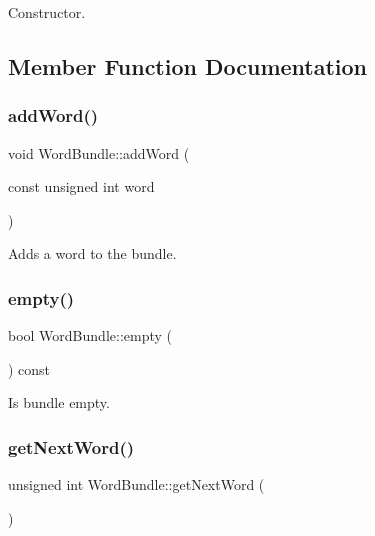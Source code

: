 Constructor. 



\subsection{Member Function Documentation}
\mbox{\label{class_word_bundle_a167d2b6b4f504e4347191a8e5bb47e5e}} 
\subsubsection{\texorpdfstring{add\+Word()}{addWord()}}
{\footnotesize\ttfamily void Word\+Bundle\+::add\+Word (\begin{DoxyParamCaption}\item[{const unsigned int}]{word }\end{DoxyParamCaption})\hspace{0.3cm}{\ttfamily [inline]}}



Adds a word to the bundle. 

\mbox{\label{class_word_bundle_a18bcb8912a877fa9e60cd8ec707e75a3}} 
\subsubsection{\texorpdfstring{empty()}{empty()}}
{\footnotesize\ttfamily bool Word\+Bundle\+::empty (\begin{DoxyParamCaption}{ }\end{DoxyParamCaption}) const\hspace{0.3cm}{\ttfamily [inline]}}



Is bundle empty. 

\mbox{\label{class_word_bundle_a950e328fdf8b00e59b2d68da5182763f}} 
\subsubsection{\texorpdfstring{get\+Next\+Word()}{getNextWord()}}
{\footnotesize\ttfamily unsigned int Word\+Bundle\+::get\+Next\+Word (\begin{DoxyParamCaption}{ }\end{DoxyParamCaption})\hspace{0.3cm}{\ttfamily [inline]}}



